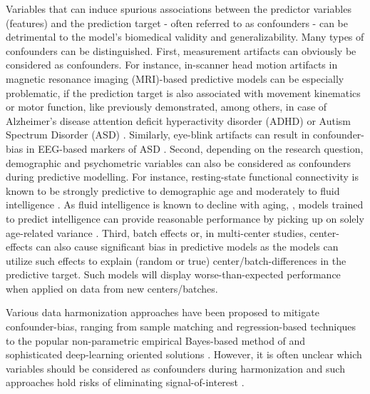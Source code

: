 \documentclass{article}
\begin{document}
Variables that can induce spurious associations between the predictor variables (features) and the prediction target - often referred to as confounders - can be detrimental to the model's biomedical validity and generalizability. Many types of confounders can be distinguished.
First, measurement artifacts can obviously be considered as confounders. For instance, in-scanner head motion artifacts in magnetic resonance imaging (MRI)-based predictive models can be especially problematic, if the prediction target is also associated with movement kinematics or motor function, like previously demonstrated, among others, in case of Alzheimer's disease \citep{rao2017predictive} attention deficit hyperactivity disorder (ADHD) \citep{couvy2016head, eloyan2012automated} or Autism Spectrum Disorder (ASD) \citep{spisak2014voxel, spisak2019optimal, gotts2013perils}. Similarly, eye-blink artifacts can result in confounder-bias in EEG-based markers of ASD  \citep{eldridge2014robust}.
Second, depending on the research question, demographic and psychometric variables can also be considered as confounders during predictive modelling. For instance, resting-state functional connectivity is known to be strongly predictive to  demographic age \citep{wang2012decoding, dukart2011age} and moderately to fluid intelligence \citep{he2020deep, cole2012global}. As fluid intelligence is known to decline with aging, \citep{kievit2018neural}, models trained to predict intelligence can provide reasonable performance by picking up on solely age-related variance \citep{lohmann2021predicting, dubois2018distributed}. 
Third, batch effects or, in multi-center studies, center-effects can also cause significant bias in predictive models \citep{leek2010tackling, da2020performance} as the models can utilize such effects to explain (random or true) center/batch-differences in the predictive target. Such models will display worse-than-expected performance when applied on data from new centers/batches.

Various data harmonization approaches have been proposed to mitigate confounder-bias, ranging from sample matching \citep{rao2017predictive} and regression-based techniques \citep{rao2017predictive, dukart2011age, spisak2014voxel, abdulkadir2014reduction} to the popular non-parametric empirical Bayes-based method of \cite{johnson2007adjusting} and sophisticated deep-learning oriented solutions \citep{zhao2020training, hognon2019standardization}. However, it is often unclear which variables should be considered as confounders during harmonization and such approaches hold risks of eliminating signal-of-interest \citep{wachinger2021detect}.
\end{document}
